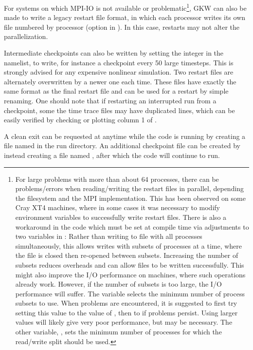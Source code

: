 For systems on which MPI-IO is not available or problematic\footnote{
For large problems with more than about 64 processes,
there can be problems/errors when reading/writing the restart files in
parallel, depending the filesystem and the MPI implementation.
This has been observed on some Cray XT4 machines, where in
some cases it was necessary to modify environment variables to
successfully write restart files. There is also a workaround in the
code which must be set at compile time via adjustments to two variables in
: Rather than writing to file with all processes
simultaneously, this allows writes with subsets of processes
at a time, where the file is closed then re-opened between subsets.
Increasing the number of subsets reduces overheads and can allow files to
be written successfully. This might also improve the I/O performance on
machines, where such operations already work. 
However, if the number of subsets is too large, the I/O
performance will suffer. The variable  selects
the minimum number of process subsets to use. When problems are encountered, 
it is suggested to first try setting this value to the value of , 
then to  if problems persist. Using larger values will
likely give very poor performance, but may be necessary. The other variable,
, sets the minimum number of processes for which
the read/write split should be used.},
GKW can also be made to write
a legacy restart file format, in which each processor writes its own file 
 numbered by processor (option  in ).  
In this case, restarts may not alter the parallelization.

Intermediate checkpoints can also be written by setting the integer  in the  namelist,
to write, for instance a checkpoint every 50 large timesteps.  This is strongly advised for any expensive nonlinear simulation.  
Two restart files  are alternately overwritten by a newer one each time.  These files have exactly the 
same format as the final restart file  and can be used for a restart by simple renaming.
One should note that if restarting an interrupted run from a checkpoint,  some the time trace files may have duplicated lines, 
which can be easily verified by checking or plotting column 1 of .

A clean exit can be requested at anytime while the code is running by creating a
file named  in the run directory. An additional checkpoint 
file can be created by instead creating a file named , after which
the code will continue to run. 

